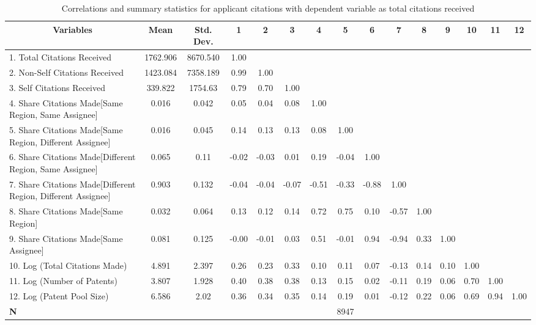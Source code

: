 \begin{sidewaystable}[htbp]\centering \caption{Correlations and summary statistics for applicant citations with dependent variable as total citations received \label{a.tcorrelation}}
\scriptsize
\onehalfspacing
\begin{tabular}{l  c  c  c  c  c  c  c  c  c  c  c  c  c  c }\hline\hline
\multicolumn{1}{c}{Variables} & \textbf{Mean}& \textbf{Std. Dev.}&1&2&3&4&5&6&7&8&9&10&11&12\\ \hline
1. Total Citations Received& 1762.906 & 8670.540&1.00\\
2. Non-Self Citations Received& 1423.084 & 7358.189&0.99&1.00\\
3. Self Citations Received& 339.822 & 1754.63&0.79&0.70&1.00\\
4. Share Citations Made[Same Region, Same Assignee] & 0.016 & 0.042&0.05&0.04&0.08&1.00\\
5. Share Citations Made[Same Region, Different Assignee]& 0.016 & 0.045&0.14&0.13&0.13&0.08&1.00\\
6. Share Citations Made[Different Region, Same Assignee]& 0.065 & 0.11&-0.02&-0.03&0.01&0.19&-0.04&1.00\\
7. Share Citations Made[Different Region, Different Assignee]& 0.903 & 0.132&-0.04&-0.04&-0.07&-0.51&-0.33&-0.88&1.00\\
8. Share Citations Made[Same Region]& 0.032 & 0.064&0.13&0.12&0.14&0.72&0.75&0.10&-0.57&1.00\\
9. Share Citations Made[Same Assignee] & 0.081 & 0.125&-0.00&-0.01&0.03&0.51&-0.01&0.94&-0.94&0.33&1.00\\
10. Log (Total Citations Made)& 4.891 & 2.397&0.26&0.23&0.33&0.10&0.11&0.07&-0.13&0.14&0.10&1.00\\
11. Log (Number of Patents)& 3.807 & 1.928&0.40&0.38&0.38&0.13&0.15&0.02&-0.11&0.19&0.06&0.70&1.00\\
12. Log (Patent Pool Size)& 6.586 & 2.02&0.36&0.34&0.35&0.14&0.19&0.01&-0.12&0.22&0.06&0.69&0.94&1.00\\
\hline
\textbf{N}&&&&&&&8947\\
\hline \hline 
 \end{tabular}
\end{sidewaystable}
